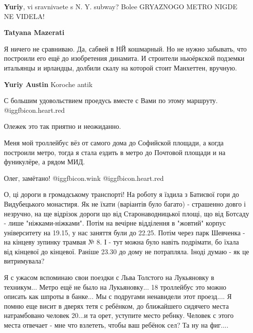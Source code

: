 \begin{itemize}
\begin{itemize} %
\textbf{Yuriy}, vi sravnivaete s N. Y. subway? Bolee GRYAZNOGO METRO NIGDE NE VIDELA!

\textbf{Tatyana Mazerati} 

Я ничего не сравниваю. Да, сабвей в НЙ кошмарный. Но не нужно забывать, что
построили его ещё до изобретения динамита. И строители ньюёркской подземки
итальянцы и ирландцы, долбили скалу на которой стоит Манхеттен, вручную.


\textbf{Yuriy Austin} Koroche antik
\end{itemize} %


С большим удовольствием проедусь вместе с Вами по этому маршруту.
@igg{fbicon.heart.red}

\begin{itemize} %
Олежек это так приятно и неожиданно.


Меня мой троллейбус вёз от самого дома до Софийской площади, а когда построили
метро, тогда я стала ездить в метро до Почтовой площади и на фуникулёре, а
рядом МИД.

Олег, замётано! @igg{fbicon.wink}  @igg{fbicon.heart.red}
\end{itemize} %


О, ці дороги в громадському транспорті! На роботу я їздила з Батиєвої гори до
Видубецького монастиря. Як не їхати (варіантів було багато) - страшенно довго і
незручно, на ще відрізок дороги що від Старонаводницької площі, що від Ботсаду
- лише "ніжками-ніжками". Потім на вечірне відділення в "жовтий" корпус
університету на 19.15, у нас заняття були до 22.25. Потім через парк Шевченка -
на кінцеву зупинку трамвая № 8. І - тут можна було навіть подрімати, бо їхала
від кінцевої до кінцевої. Раніше 23.30 до дому не потрапляла. Іноді думаю - як
це витримувала?



Я с ужасом вспоминаю свои поездки с Льва Толстого на Лукьяновку в техникум...
Метро ещё не было на Лукьяновку... 18 троллейбус это можно описать как шпроты в
банке... Мы с подругами ненавидели этот проезд.... Я помню еще висит в дверях
тетя с ребёнком, до ближайшего сидячего места натрамбовано человек 20...и та
орет, уступите место ребнку. Человек с этого места отвечает - мне что взлететь,
чтобы ваш ребёнок сел? Та ну на фиг....


\end{itemize}
